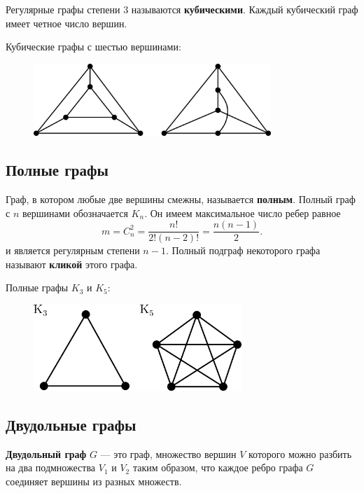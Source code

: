 Регулярные графы степени \(3\) называются \textbf{кубическими}. Каждый кубический граф имеет четное число вершин.

\begin{example*}
    Кубические графы с шестью вершинами:
    \begin{figure}[H]
        \centering
        \includegraphics[width=0.8\textwidth]{./images/homogeneous-graphs.png}
    \end{figure}
\end{example*}

\subsection{Полные графы}

Граф, в котором любые две вершины смежны, называется \textbf{полным}. Полный граф с \(n\) вершинами обозначается \(K_n\). Он имеем максимальное число ребер равное
\[
    m = C_n^2 = \frac{n!}{2! (n - 2)!} = \frac{n (n - 1)}{2}.
\]
и является регулярным степени \(n - 1\). Полный подграф некоторого графа называют \textbf{кликой} этого графа.

\begin{example*}
    Полные графы \(K_3\) и \(K_5\):
    \begin{figure}[H]
        \centering
        \includegraphics[width=0.7\textwidth]{images/complete-graphs.png}
    \end{figure}
\end{example*}

\subsection{Двудольные графы}

\textbf{Двудольный граф} \(G\) --- это граф, множество вершин \(V\) которого можно разбить на два подмножества \(V_1\) и \(V_2\) таким образом, что каждое ребро графа \(G\) соединяет вершины из разных множеств.

